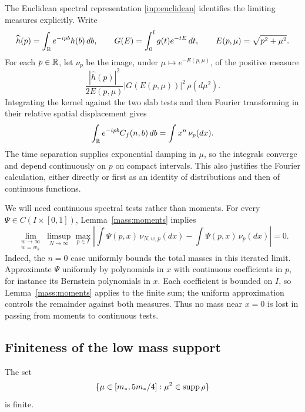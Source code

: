 The Euclidean spectral representation \eqref{inp:euclidean} identifies the
limiting measures explicitly. Write
\[
 \widehat h(p)=\int_\mathbb R e^{-ipb}h(b)\,db,
 \qquad G(E)=\int_0^l g(t)e^{-tE}\,dt,
 \qquad E(p,\mu)=\sqrt{p^2+\mu^2}.
\]
For each $p\in\mathbb R$, let $\nu_p$ be the image, under
$\mu\mapsto e^{-E(p,\mu)}$, of the positive measure
\begin{equation}\label{mass:measure}
 \frac{|\widehat h(p)|^2}{2E(p,\mu)}
       |G(E(p,\mu))|^2\,\rho(d\mu^2).
\end{equation}
Integrating the kernel against the two slab tests and then Fourier
transforming in their relative spatial displacement gives
\[
 \int_\mathbb R e^{-ipb}C_f(n,b)\,db=\int x^n\,\nu_p(dx).
\]
The time separation supplies exponential damping in $\mu$, so the
integrals converge and depend continuously on $p$ on compact intervals.
This also justifies the Fourier calculation, either directly or first
as an identity of distributions and then of continuous functions.

We will need continuous spectral tests rather than moments. For every
$\Psi\in C(I\times[0,1])$, Lemma~\ref{mass:moments} implies
\begin{equation}\label{mass:continuous-tests}
 \lim_{\substack{w\to\infty\\w=w_k}}\limsup_{N\to\infty}
 \max_{p\in I}
 \left|
  \int\Psi(p,x)\,\nu_{N,w,p}(dx)
   -\int\Psi(p,x)\,\nu_p(dx)
 \right|=0.
\end{equation}
Indeed, the $n=0$ case uniformly bounds the total masses in this iterated
limit. Approximate $\Psi$ uniformly by polynomials in $x$ with continuous
coefficients in $p$, for instance its Bernstein polynomials in $x$.
Each coefficient is bounded on $I$, so Lemma~\ref{mass:moments} applies
to the finite sum; the uniform approximation controls the remainder
against both measures. Thus no mass near $x=0$ is lost in passing from
moments to continuous tests.

\subsection{Finiteness of the low mass support}

\begin{proposition}\label{mass:finite-support}
The set
\[
 \{\mu\in[m_*,5m_*/4]:\mu^2\in\operatorname{supp}\rho\}
\]
is finite.
\end{proposition}

